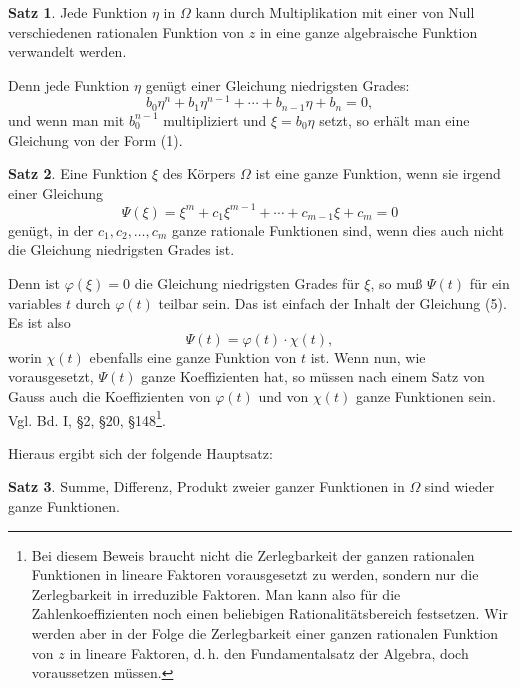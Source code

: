 \documentclass[12pt,a4paper]{article}
\theoremstyle{definition}
\newtheorem{satz}{Satz}[section]
\begin{document}
\begin{satz}
Jede Funktion $\eta$ in $\Omega$ kann durch Multiplikation mit einer von Null verschiedenen rationalen Funktion von $z$ in eine ganze algebraische Funktion verwandelt werden.
\end{satz}
Denn jede Funktion $\eta$ genügt einer Gleichung niedrigsten Grades:
\begin{equation}
b_0\eta^n + b_1\eta^{n-1} + \cdots + b_{n-1}\eta + b_n = 0,
\end{equation}
und wenn man mit $b_0^{n-1}$ multipliziert und $\xi = b_0\eta$ setzt, so erhält man eine Gleichung von der Form (1).

\begin{satz}
Eine Funktion $\xi$ des Körpers $\Omega$ ist eine ganze Funktion, wenn sie irgend einer Gleichung
\begin{equation}
\Psi(\xi) = \xi^m + c_1\xi^{m-1} + \cdots + c_{m-1}\xi + c_m = 0
\end{equation}
genügt, in der $c_1, c_2, \ldots, c_m$ ganze rationale Funktionen sind, wenn dies auch nicht die Gleichung niedrigsten Grades ist.
\end{satz}

Denn ist $\varphi(\xi) = 0$ die Gleichung niedrigsten Grades für $\xi$, so muß $\Psi(t)$ für ein variables $t$ durch $\varphi(t)$ teilbar sein. Das ist einfach der Inhalt der Gleichung (5). Es ist also
\[\Psi(t) = \varphi(t) \cdot \chi(t),\]
worin $\chi(t)$ ebenfalls eine ganze Funktion von $t$ ist. Wenn nun, wie vorausgesetzt, $\Psi(t)$ ganze Koeffizienten hat, so müssen nach einem Satz von Gauss auch die Koeffizienten von $\varphi(t)$ und von $\chi(t)$ ganze Funktionen sein. Vgl. Bd. I, \S 2, \S 20, \S 148\footnote{Bei diesem Beweis braucht nicht die Zerlegbarkeit der ganzen rationalen Funktionen in lineare Faktoren vorausgesetzt zu werden, sondern nur die Zerlegbarkeit in irreduzible Faktoren. Man kann also für die Zahlenkoeffizienten noch einen beliebigen Rationalitätsbereich festsetzen. Wir werden aber in der Folge die Zerlegbarkeit einer ganzen rationalen Funktion von $z$ in lineare Faktoren, d.\,h. den Fundamentalsatz der Algebra, doch voraussetzen müssen.}.

Hieraus ergibt sich der folgende Hauptsatz:

\begin{satz}
Summe, Differenz, Produkt zweier ganzer Funktionen in $\Omega$ sind wieder ganze Funktionen.
\end{satz}
\end{document}
